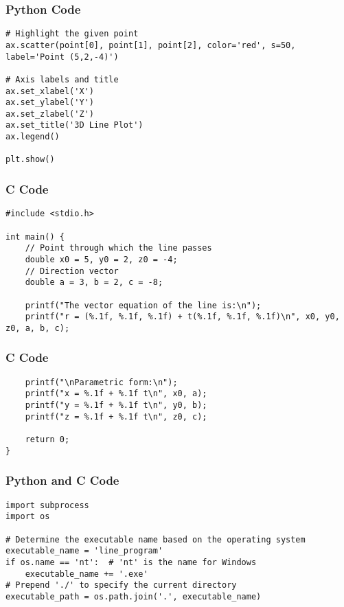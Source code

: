 \documentclass{beamer}
\begin{document}
\begin{frame}[fragile]
    \frametitle{Python Code}
    \begin{lstlisting}
# Highlight the given point
ax.scatter(point[0], point[1], point[2], color='red', s=50, label='Point (5,2,-4)')

# Axis labels and title
ax.set_xlabel('X')
ax.set_ylabel('Y')
ax.set_zlabel('Z')
ax.set_title('3D Line Plot')
ax.legend()

plt.show()
    \end{lstlisting}
\end{frame}



\begin{frame}[fragile]
\frametitle{C Code}
\begin{lstlisting}
#include <stdio.h>

int main() {
    // Point through which the line passes
    double x0 = 5, y0 = 2, z0 = -4;
    // Direction vector
    double a = 3, b = 2, c = -8;

    printf("The vector equation of the line is:\n");
    printf("r = (%.1f, %.1f, %.1f) + t(%.1f, %.1f, %.1f)\n", x0, y0, z0, a, b, c);
\end{lstlisting}
\end{frame}

\begin{frame}[fragile]
\frametitle{C Code}
\begin{lstlisting}
    printf("\nParametric form:\n");
    printf("x = %.1f + %.1f t\n", x0, a);
    printf("y = %.1f + %.1f t\n", y0, b);
    printf("z = %.1f + %.1f t\n", z0, c);

    return 0;
}
\end{lstlisting}
\end{frame}

\begin{frame}[fragile]
\frametitle{Python and C Code}
\begin{lstlisting}
import subprocess
import os

# Determine the executable name based on the operating system
executable_name = 'line_program'
if os.name == 'nt':  # 'nt' is the name for Windows
    executable_name += '.exe'
# Prepend './' to specify the current directory
executable_path = os.path.join('.', executable_name)
\end{lstlisting}
\end{frame}
\end{document}
